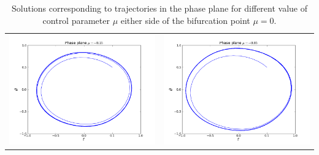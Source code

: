 \documentclass[12pt,a4paper,titlepage]{article}
\begin{document}
\begin{table}[ht]
\begin{tabular}{cc}
\includegraphics[scale=0.3]{phase_snic015m}&\includegraphics[scale=0.3]{phase_snic005m}\\
\end{tabular}
\caption{Solutions corresponding to trajectories in the phase plane for different value of
control parameter $\mu$ either side of the bifurcation point $\mu = 0$.}
\label{fig:phase_plane_hopf}
\end{table}
\end{document}
